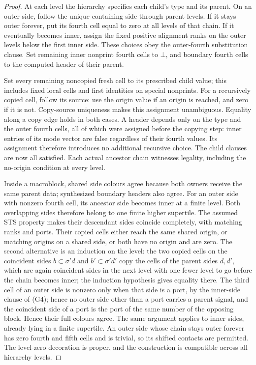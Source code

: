 \begin{proof}
At each level the hierarchy specifies each child's type and its parent.
On an outer side, follow the unique containing side through parent levels.
If it stays outer forever, put its fourth cell equal to zero at all levels
of that chain. If it eventually becomes inner, assign the fixed positive
alignment ranks on the outer levels below the first inner side. These
choices obey the outer-fourth substitution clause. Set remaining inner nonprint
fourth cells to $\bot$, and boundary fourth cells to the computed header
of their parent.

Set every remaining noncopied fresh cell to its prescribed child value;
this includes fixed local cells and first identities on special nonprints.
For a recursively copied cell, follow its source: use the origin value if an origin is reached, and
zero if it is not. Copy-source uniqueness makes this assignment
unambiguous. Equality along a copy edge holds in both cases. A header depends
only on the type and the outer fourth cells, all of which were assigned
before the copying step: inner entries of its mode vector are false regardless
of their fourth values. Its assignment therefore introduces no additional
recursive choice. The child clauses are now
all satisfied. Each actual ancestor chain witnesses legality, including
the no-origin condition at every level.

Inside a macroblock, shared side colours agree because both owners receive
the same parent data; synthesized boundary headers also agree. For an outer
side with nonzero fourth cell, its ancestor side becomes inner at a finite
level. Both overlapping sides therefore belong to one finite higher
supertile. The assumed STS property makes their descendant sides coincide
completely, with matching ranks and ports. Their copied cells either reach
the same shared origin, or matching origins on a shared side, or both have
no origin and are zero. The second alternative is an induction on the
level: the two copied cells on the coincident sides $b\subset\sigma'd$ and
$b'\subset\sigma'd'$ copy the cells of the parent sides $d,d'$, which are
again coincident sides in the next level with one fewer level to go before
the chain becomes inner; the induction hypothesis gives equality there.
The third cell of an outer side is nonzero only when that side is a port,
by the inner-side clause of (G4); hence no outer side other than a port
carries a parent signal, and the coincident side of a port is the port of
the same number of the opposing block. Hence their full colours agree. The same argument
applies to inner sides, already lying in a finite supertile. An outer side
whose chain stays outer forever has zero fourth and fifth cells and is
trivial, so its shifted contacts are permitted. The level-zero decoration
is proper, and the construction is compatible across all hierarchy levels.
\end{proof}

